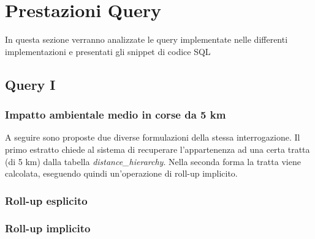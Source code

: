 \section{Prestazioni Query}
In questa sezione verranno analizzate le query implementate nelle differenti implementazioni e presentati gli snippet di codice SQL

\subsection{Query I}
\subsubsection{Impatto ambientale medio in corse da 5 km}
A seguire sono proposte due diverse formulazioni della stessa interrogazione. Il primo estratto chiede al sistema di recuperare l'appartenenza ad una certa tratta (di 5 km) dalla tabella \textit{distance\_hierarchy}. Nella seconda forma la tratta viene calcolata, eseguendo quindi un'operazione di roll-up implicito.
\subsubsection{Roll-up esplicito}

\subsubsection{Roll-up implicito}

